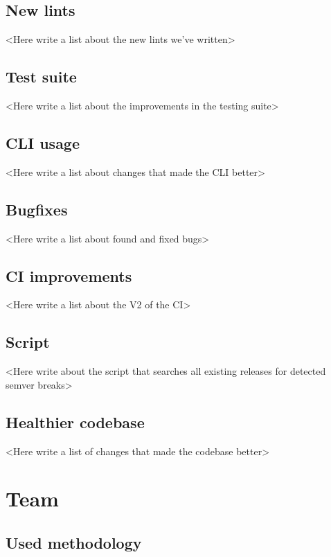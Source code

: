 \documentclass[licencjacka,en]{pracamgr}
\begin{document}
\section{New lints}

<Here write a list about the new lints we've written>


\section{Test suite}

<Here write a list about the improvements in the testing suite>


\section{CLI usage}

<Here write a list about changes that made the CLI better>


\section{Bugfixes}

<Here write a list about found and fixed bugs>


\section{CI improvements}

<Here write a list about the V2 of the CI>


\section{Script}

<Here write about the script that searches all existing releases for detected semver breaks>


\section{Healthier codebase}

<Here write a list of changes that made the codebase better>



\chapter{Team}\label{r:team}

\section{Used methodology}
\end{document}
